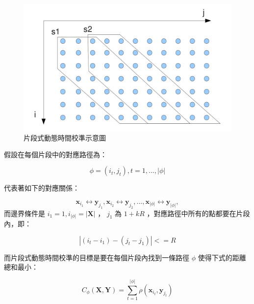 \begin{figure}[h]
\centering
\includegraphics[scale=0.3]{images/chap4_sdtw.png}
\caption{片段式動態時間校準示意圖~\cite{zhang2009unsupervised}} \label{fig:chap4_sdtw}
\end{figure}

假設在每個片段中的對應路徑為：

\[
\phi = (i_t, j_t), t = 1,...,|\phi|
\]

代表著如下的對應關係：

\[
\mathbf{x}_{i_1} \leftrightarrow \mathbf{y}_{j_1}, \mathbf{x}_{i_2} \leftrightarrow \mathbf{y}_{j_2},...,\mathbf{x}_{|\phi|} \leftrightarrow \mathbf{y}_{|\phi|},
\]
而邊界條件是  $ i_1 = 1, i_{|\phi|} = |\mathbf{X}| $  ， $ j_1 $  為  $ 1+kR $  ，對應路徑中所有的點都要在片段內，即：

\[
|(i_t-i_1)-(j_t-j_1)| <= R
\]

而片段式動態時間校準的目標是要在每個片段內找到一條路徑  $ \phi $  使得下式的距離總和最小：

\begin{equation}
C_{\phi}(\mathbf{X}, \mathbf{Y}) = \sum_{t=1}^{|\phi|} \rho(\mathbf{x}_{i_t},\mathbf{y}_{j_t})
\end{equation}

